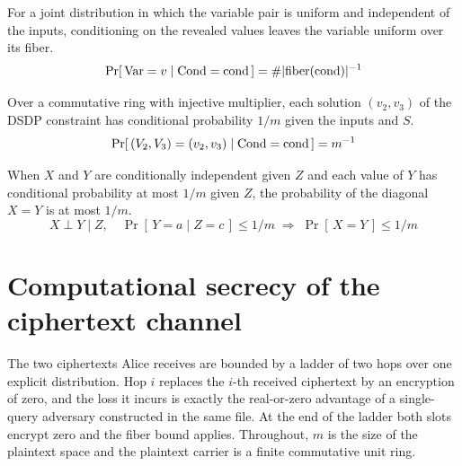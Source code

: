 \begin{lemma}
  \label{lem:exist_cpr_fiber}
  \rocqok
  For a joint distribution in which the variable pair is uniform and
  independent of the inputs, conditioning on the revealed values leaves the
  variable uniform over its fiber.
  \[ \Pr[\,\mathrm{Var}=v \mid \mathrm{Cond}=\mathrm{cond}\,]
        = \#\lvert\mathrm{fiber}(\mathrm{cond})\rvert^{-1} \]
\end{lemma}

\begin{lemma}
  \label{lem:exist_pr_sol}
  \rocqok
  Over a commutative ring with injective multiplier, each solution $(v_2,v_3)$ of
  the DSDP constraint has conditional probability $1/m$ given the inputs and $S$.
  \[ \Pr[\,(V_2,V_3)=(v_2,v_3)\mid \mathrm{Cond}=\mathrm{cond}\,] = m^{-1} \]
\end{lemma}

\begin{lemma}
  \label{lem:cinde_diagonal_bound}
  \rocqok
  When $X$ and $Y$ are conditionally independent given $Z$ and each value of $Y$
  has conditional probability at most $1/m$ given $Z$, the probability of the
  diagonal $X = Y$ is at most $1/m$.
  \[ X \perp Y \mid Z,\quad \Pr[\,Y = a \mid Z = c\,] \le 1/m
        \;\Longrightarrow\; \Pr[\,X = Y\,] \le 1/m \]
\end{lemma}

\chapter{Computational secrecy of the ciphertext channel}
\label{ch:hopping}

The two ciphertexts Alice receives are bounded by a ladder of two hops over one
explicit distribution. Hop $i$ replaces the $i$-th received ciphertext by an
encryption of zero, and the loss it incurs is exactly the
real-or-zero advantage of a single-query adversary constructed in the same file.
At the end of the ladder both slots encrypt zero and the fiber bound applies.
Throughout, $m$ is the size of the plaintext space and the plaintext carrier is a
finite commutative unit ring.


